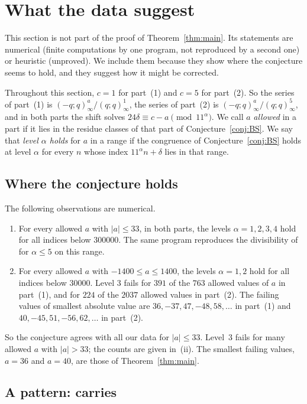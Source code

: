 \documentclass[11pt]{amsart}
\theoremstyle{definition}
\theoremstyle{remark}
\newcommand{\poch}[2]{(#1;#2)_{\infty}}
\begin{document}
\section{What the data suggest}\label{sec:data}

This section is not part of the proof of Theorem~\ref{thm:main}. Its statements are numerical (finite computations by one program, not reproduced by a second one) or heuristic (unproved). We include them because they show where the conjecture seems to hold, and they suggest how it might be corrected.

Throughout this section, \(c=1\) for part~(1) and \(c=5\) for part~(2). So the series of part~(1) is \(\poch{-q}{q}^a/\poch{q}{q}^{1}\), the series of part~(2) is \(\poch{-q}{q}^a/\poch{q}{q}^{5}\), and in both parts the shift solves \(24\delta\equiv c-a\pmod{11^\alpha}\). We call \(a\) \emph{allowed} in a part if it lies in the residue classes of that part of Conjecture~\ref{conj:BS}. We say that \emph{level \(\alpha\) holds} for \(a\) in a range if the congruence of Conjecture~\ref{conj:BS} holds at level \(\alpha\) for every \(n\) whose index \(11^\alpha n+\delta\) lies in that range.

\subsection{Where the conjecture holds}
The following observations are numerical.
\begin{enumerate}
\item[(i)] For every allowed \(a\) with \(|a|\le33\), in both parts, the levels \(\alpha=1,2,3,4\) hold for all indices below \(300000\). The same program reproduces the divisibility of~\cite[Thm.~1.1]{BS} for \(\alpha\le5\) on this range.
\item[(ii)] For every allowed \(a\) with \(-1400\le a\le1400\), the levels \(\alpha=1,2\) hold for all indices below \(30000\). Level \(3\) fails for \(391\) of the \(763\) allowed values of \(a\) in part~(1), and for \(224\) of the \(2037\) allowed values in part~(2). The failing values of smallest absolute value are \(36,-37,47,-48,58,\dots\) in part~(1) and \(40,-45,51,-56,62,\dots\) in part~(2).
\end{enumerate}
So the conjecture agrees with all our data for \(|a|\le33\). Level~\(3\) fails for many allowed \(a\) with \(|a|>33\); the counts are given in~(ii). The smallest failing values, \(a=36\) and \(a=40\), are those of Theorem~\ref{thm:main}.

\subsection{A pattern: carries}
\end{document}
